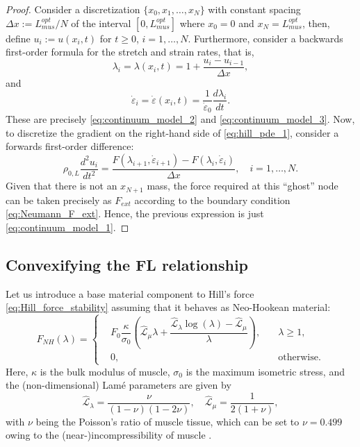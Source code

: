 \documentclass{sfuthesis}
\numberwithin{equation}{section}
\numberwithin{figure}{chapter}
\numberwithin{table}{chapter}
\theoremstyle{definition}
\newcommand{\depsilon}{\dot{\varepsilon}}
\begin{document}
\begin{proof}
    Consider a discretization $\{x_0, x_1, \dots, x_N\}$ with constant spacing $\Delta x := L_{mus}^{opt}/N$ of the interval $[0,L_{mus}^{opt}]$ where $x_0 = 0$ and $x_N = L_{mus}^{opt}$, then, define $u_i := u(x_i,t)$ for $t \geq 0$, $i=1,\dots,N$. Furthermore, consider a backwards first-order formula for the stretch and strain rates, that is,
    \[
        \lambda_i = \lambda(x_i,t) = 1 + \dfrac{u_i-u_{i-1}}{\Delta x},
    \]
    and
    \[
        \depsilon_i = \depsilon(x_i, t) = \dfrac{1}{\depsilon_0}\dfrac{d\lambda_i}{dt}.
    \]
    These are precisely \eqref{eq:continuum_model_2} and \eqref{eq:continuum_model_3}. Now, to discretize the gradient on the right-hand side of \eqref{eq:hill_pde_1}, consider a forwards first-order difference:
    \[
        \rho_{0,L} \dfrac{d^2 u_i}{dt^2} = \dfrac{F(\lambda_{i+1},\depsilon_{i+1}) - F(\lambda_i, \depsilon_i)}{\Delta x}, \quad i =1, \dots, N.
    \]
    Given that there is not an $x_{N+1}$ mass, the force required at this ``ghost'' node can be taken precisely as $F_{ext}$ according to the boundary condition \eqref{eq:Neumann_F_ext}. Hence, the previous expression is just \eqref{eq:continuum_model_1}.
\end{proof}

\subsection{Convexifying the FL relationship}

Let us introduce a base material component to Hill's force \eqref{eq:Hill_force_stability} assuming that it behaves as Neo-Hookean material:
\begin{equation} \label{eq:force_neohookean}
    F_{NH}(\lambda) = \left\{
        \begin{aligned}
            &F_0 \dfrac{\kappa}{\sigma_0} \left( \widehat{\mathcal{L}}_{\mu} \lambda +  \dfrac{\widehat{\mathcal{L}}_{\lambda} \log(\lambda) - \widehat{\mathcal{L}}_\mu}{\lambda}\right), \quad &\lambda \geq 1, \\
            &0, \quad &\text{otherwise}.
        \end{aligned}
    \right.
\end{equation}
Here, $\kappa$ is the bulk modulus of muscle, $\sigma_0$ is the maximum isometric stress, and the (non-dimensional) Lam\'{e} parameters are given by
\begin{equation}
    \widehat{\mathcal{L}}_{\lambda} = \dfrac{\nu}{(1-\nu)(1-2\nu)}, \quad \widehat{\mathcal{L}}_{\mu} = \dfrac{1}{2(1+\nu)},
\end{equation}
with $\nu$ being the Poisson's ratio of muscle tissue, which can be set to $\nu = 0.499$ owing to the (near-)incompressibility of muscle \cite{Kuthe2016}.
\end{document}
